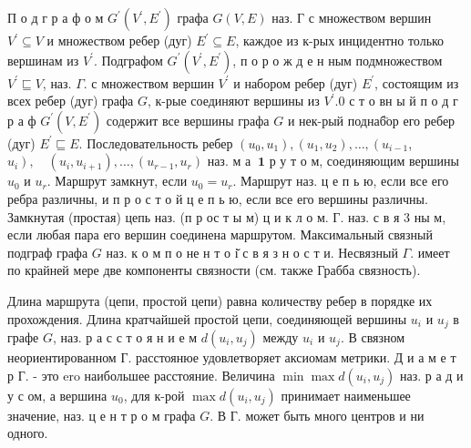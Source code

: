 \documentclass[10pt]{article}
\begin{document}
П о д г р а ф о м $G^{\prime}\left(V^{\prime}, E^{\prime}\right)$ графа $G(V, E)$ наз. Г с множеством вершин $V^{\prime} \subseteq V$ и множеством ребер (дуг) $E^{\prime} \subseteq E$, каждое из к-рых инцидентно только вершинам из $V^{\prime}$. Подграфом $G^{\prime}\left(V^{\prime}, E^{\prime}\right)$, п о р о ж д е н ным подмножеством $V^{\prime} \sqsubseteq V$, наз. $\Gamma$. с множеством вершин $V^{\prime}$ и набором ребер (дуг) $E^{\prime}$, состоящим из всех ребер (дуг) графа $G$, к-рые соединяют вершины из $V^{\prime} .0$ с т о вн ы й п о д г р а ф $G^{\prime}\left(V, E^{\prime}\right)$ содержит все вершины графа $G$ и нек-рый поднаб̈ор его ребер (дуг) $E^{\prime} \sqsubseteq E$. Последовательность ребер $\left(u_{0}, u_{1}\right),\left(u_{1}, u_{2}\right), \ldots,\left(u_{i-1}\right.$, $\left.u_{i}\right), \quad\left(u_{i}, u_{i+1}\right), \ldots,\left(u_{r-1}, u_{r}\right)$ наз. м а $\mathbf{~} \mathbf{1}$ р у т о м, соединяющим вершины $u_{0}$ и $u_{r}$. Маршрут замкнут, если $u_{0}=u_{r}$. Маршрут наз. ц е п ь ю, если все его ребра различны, и п р о с т о й ц е п ь ю, если все его вершины различны. Замкнутая (простая) цепь наз. (п р ос т ы м) ц и к л о м. Г. наз. с в я 3 ны м, если любая пара его вершин соединена маршрутом. Максимальный связный подграф графа $G$ наз. к о м п о не н т о і̆ с в я з н о с т и. Несвязный $\Gamma$. имеет по крайней мере две компоненты связности (см. также Грабба связность).



Длина маршрута (цепи, простой цепи) равна количеству ребер в порядке их прохождения. Длина кратчайшей простой цепи, соединяющей вершины $u_{i}$ и $u_{j}$ в графе $G$, наз. р а с с т о я н и е м $d\left(u_{i}, u_{j}\right)$ между $u_{i}$ и $u_{j}$. В связном неориентированном Г. расстоянюе удовлетворяет аксиомам метрики. Д и а м е т р Г. - это ero наибольшее расстояние. Величина $\min \max d\left(u_{i}, u_{j}\right)$ наз. р а д и у с ом, а вершина $u_{0}$, для к-рой $\max d\left(u_{i}, u_{j}\right)$ принимает наименьшее значение, наз. ц е н т р о м графа $G$. В Г. может быть много центров и ни одного.
\end{document}
